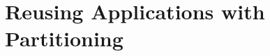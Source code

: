 \declarecommand{\sysname}{\civet{}}

\chapter{Reusing \java{} Applications with Partitioning}
\label{chap:civet}







%

